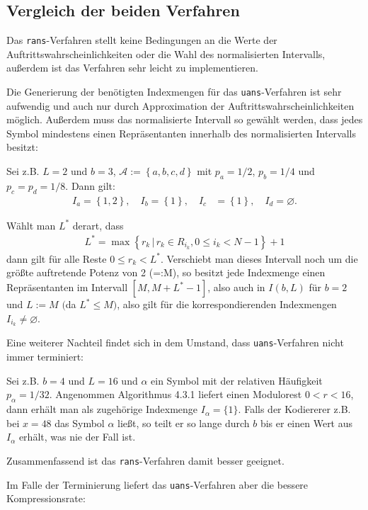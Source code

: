 \documentclass[a4paper,12pt]{article}
\newcommand{\A}{\mathcal A}
\newcounter{Algorithmus}
\begin{document}
\subsection{Vergleich der beiden Verfahren}
Das {\tt{rans}}-Verfahren stellt keine Bedingungen an die Werte der Auftrittswahrscheinlichkeiten oder die Wahl des normalisierten Intervalls, außerdem ist das Verfahren sehr leicht zu implementieren.
\par
Die Generierung der benötigten Indexmengen für das {\tt{uans}}-Verfahren ist sehr aufwendig und auch nur durch Approximation der Auftrittswahrscheinlichkeiten möglich. Außerdem
muss das normalisierte Intervall so gewählt werden, dass jedes Symbol mindestens einen Repräsentanten innerhalb  des normalisierten Intervalls besitzt:
\par
Sei z.B. $L=2$ und $b=3$, $\A:=\left\{a, b, c, d\right\}$ mit $p_{a}=1/2$, $p_{b}=1/4$ und $p_{c}=p_{d}=1/8$. 
Dann gilt:
\begin{align*}
I_{a}=\left\{1,2\right\},\quad  I_{b}=\left\{1\right\},\quad I_{c}&=\left\{1\right\},\quad I_{d}=\varnothing.
\end{align*}
\par
Wählt man $L^{*}$ derart, dass 
\begin{align*}
L^{*} = \max \left\{r_{k}\,|\,r_{k}\in R_{i_{k}}, 0\leq i_{k} < N-1\right\} +1
\end{align*} 
dann gilt für alle Reste $0 \leq r_{k} < L^{*}$. Verschiebt man dieses Intervall noch um die größte auftretende Potenz von 2 (=:M), so besitzt jede Indexmenge einen Repräsentanten im Intervall $[M,M + L^{*}-1]$, also auch in $I(b,L)$ für $b=2$ und $L:=M$ $($da $L^{*} \leq M)$, also gilt für die korrespondierenden Indexmengen $I_{i_{k}} \neq \varnothing$.
\par
Eine weiterer Nachteil findet sich in dem Umstand, dass {\tt{uans}}-Verfahren nicht immer terminiert:
\par
Sei z.B. $b=4$ und $L=16$ und $\alpha$ ein Symbol mit der relativen Häufigkeit $p_{\alpha}=1/32$. Angenommen Algorithmus 4.3.1 liefert einen Modulorest $0 < r < 16$, dann erhält man als zugehörige Indexmenge $I_{\alpha}=\{1\}$. Falls der Kodiererer z.B. bei  $x=48$ das Symbol $\alpha$ ließt, so teilt er so lange durch $b$ bis er einen Wert aus $I_{\alpha}$ erhält, was nie der Fall ist.
\par
Zusammenfassend ist das {\tt{rans}}-Verfahren damit besser geeignet. 
\par
Im Falle der Terminierung liefert das {\tt{uans}}-Verfahren  aber die bessere Kompressionsrate:
\end{document}
